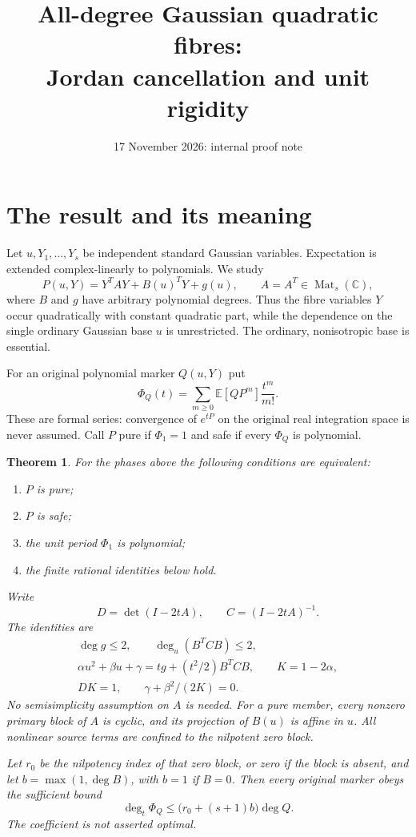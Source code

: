 \documentclass[11pt]{article}
\title{All-degree Gaussian quadratic fibres:\\Jordan cancellation and unit rigidity}
\author{}\date{17 November 2026: internal proof note}
\newtheorem{theorem}{Theorem}[section]
\theoremstyle{definition}\newtheorem{definition}[theorem]{Definition}
\theoremstyle{remark}\newtheorem{remark}[theorem]{Remark}
\newcommand{\E}{\mathbb E}
\newcommand{\C}{\mathbb C}
\begin{document}
\maketitle

\section{The result and its meaning}

Let $u,Y_1,\ldots,Y_s$ be independent standard Gaussian variables.
Expectation is extended complex-linearly to polynomials. We study
\[
 P(u,Y)=Y^TAY+B(u)^TY+g(u),\qquad A=A^T\in\operatorname{Mat}_s(\C),
\]
where $B$ and $g$ have arbitrary polynomial degrees. Thus the fibre
variables $Y$ occur quadratically with constant quadratic part,
while the dependence on the single ordinary Gaussian base $u$ is
unrestricted. The ordinary, nonisotropic base is essential.

For an original polynomial marker $Q(u,Y)$ put
\[
 \Phi_Q(t)=\sum_{m\ge0}\E[QP^m]\frac{t^m}{m!}.
\]
These are formal series: convergence of $e^{tP}$ on the original
real integration space is never assumed. Call $P$ pure if $\Phi_1=1$
and safe if every $\Phi_Q$ is polynomial.

\begin{theorem}\label{thm:fullfibre}
For the phases above the following conditions are equivalent:
\begin{enumerate}
\item $P$ is pure;
\item $P$ is safe;
\item the unit period $\Phi_1$ is polynomial;
\item the finite rational identities below hold.
\end{enumerate}
Write
\[
 D=\det(I-2tA),\qquad C=(I-2tA)^{-1}.
\]
The identities are
\begin{gather}
 \deg g\le2,\qquad \deg_u(B^TCB)\le2,\label{eq:degrees}\\
 \alpha u^2+\beta u+\gamma=tg+(t^2/2)B^TCB,
 \qquad K=1-2\alpha,\label{eq:coefficients}\\
 DK=1,\qquad \gamma+\beta^2/(2K)=0.\label{eq:purity}
\end{gather}
No semisimplicity assumption on $A$ is needed. For a pure member,
every nonzero primary block of $A$ is cyclic, and its projection
of $B(u)$ is affine in $u$. All nonlinear source terms are
confined to the nilpotent zero block.

Let $r_0$ be the nilpotency index of that zero block, or zero if
the block is absent, and let $b=\max(1,\deg B)$, with $b=1$ if
$B=0$. Then every original marker obeys the sufficient bound
\begin{equation}\label{eq:cutoff}
 \deg_t\Phi_Q\le\bigl(r_0+(s+1)b\bigr)\deg Q.
\end{equation}
The coefficient is not asserted optimal.
\end{theorem}
\end{document}
